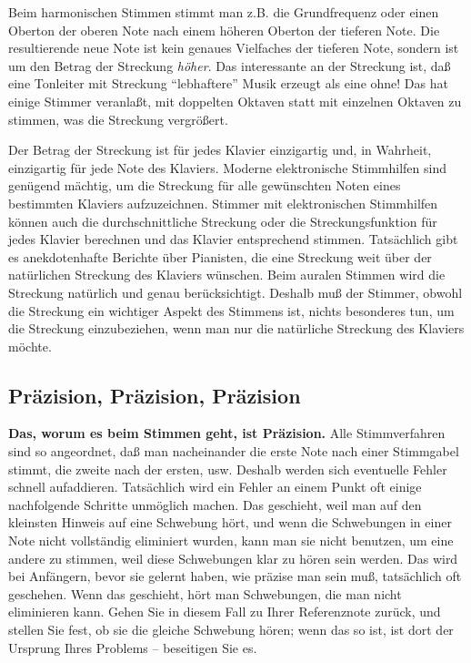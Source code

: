 Beim harmonischen Stimmen stimmt man z.B. die Grundfrequenz oder einen Oberton der oberen Note nach einem höheren Oberton der tieferen Note.
Die resultierende neue Note ist kein genaues Vielfaches der tieferen Note, sondern ist um den Betrag der Streckung \textit{höher}.
Das interessante an der Streckung ist, daß eine Tonleiter mit Streckung \enquote{lebhaftere} Musik erzeugt als eine ohne!
Das hat einige Stimmer veranlaßt, mit doppelten Oktaven statt mit einzelnen Oktaven zu stimmen, was die Streckung vergrößert.

Der Betrag der Streckung ist für jedes Klavier einzigartig und, in Wahrheit, einzigartig für jede Note des Klaviers.
Moderne elektronische Stimmhilfen sind genügend mächtig, um die Streckung für alle gewünschten Noten eines bestimmten Klaviers aufzuzeichnen.
Stimmer mit elektronischen Stimmhilfen können auch die durchschnittliche Streckung oder die Streckungsfunktion für jedes Klavier berechnen und das Klavier entsprechend stimmen.
Tatsächlich gibt es anekdotenhafte Berichte über Pianisten, die eine Streckung weit über der natürlichen Streckung des Klaviers wünschen.
Beim auralen Stimmen wird die Streckung natürlich und genau berücksichtigt.
Deshalb muß der Stimmer, obwohl die Streckung ein wichtiger Aspekt des Stimmens ist, nichts besonderes tun, um die Streckung einzubeziehen, wenn man nur die natürliche Streckung des Klaviers möchte.
 

\label{c2_5l}
\subsection{Präzision, Präzision, Präzision}
\label{c2_5_prae} 

\textbf{Das, worum es beim Stimmen geht, ist Präzision.}
Alle Stimmverfahren sind so angeordnet, daß man nacheinander die erste Note nach einer Stimmgabel stimmt, die zweite nach der ersten, usw.
Deshalb werden sich eventuelle Fehler schnell aufaddieren.
Tatsächlich wird ein Fehler an einem Punkt oft einige nachfolgende Schritte unmöglich machen.
Das geschieht, weil man auf den kleinsten Hinweis auf eine Schwebung hört, und wenn die Schwebungen in einer Note nicht vollständig eliminiert wurden, kann man sie nicht benutzen, um eine andere zu stimmen, weil diese Schwebungen klar zu hören sein werden.
Das wird bei Anfängern, bevor sie gelernt haben, wie präzise man sein muß, tatsächlich oft geschehen.
Wenn das geschieht, hört man Schwebungen, die man nicht eliminieren kann.
Gehen Sie in diesem Fall zu Ihrer Referenznote zurück, und stellen Sie fest, ob sie die gleiche Schwebung hören; wenn das so ist, ist dort der Ursprung Ihres Problems -- beseitigen Sie es.

